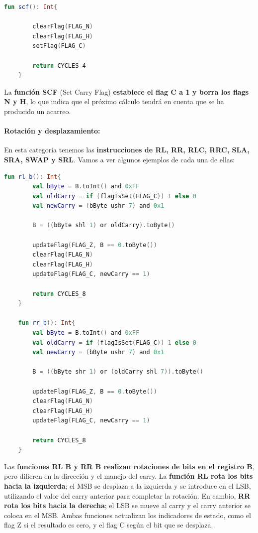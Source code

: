 \begin{lstlisting}[language=Kotlin, caption={Operación SCF}, label={code:kotlinscf}]
    fun scf(): Int{

        clearFlag(FLAG_N)
        clearFlag(FLAG_H)
        setFlag(FLAG_C)

        return CYCLES_4
    }
\end{lstlisting}

La \textbf{función SCF} (Set Carry Flag) \textbf{establece el flag C a 1 y borra los flags N y H}, lo que indica que el próximo cálculo tendrá en cuenta que se ha producido un acarreo.

\paragraph{Rotación y desplazamiento:} En esta categoría tenemos las \textbf{instrucciones de RL, RR, RLC, RRC, SLA, SRA, SWAP y SRL}. Vamos a ver algunos ejemplos de cada una de ellas:

\begin{lstlisting}[language=Kotlin, caption={Operaciones RL y RR}, label={code:kotlinrlrr}]
    fun rl_b(): Int{
        val bByte = B.toInt() and 0xFF
        val oldCarry = if (flagIsSet(FLAG_C)) 1 else 0
        val newCarry = (bByte ushr 7) and 0x1

        B = ((bByte shl 1) or oldCarry).toByte()

        updateFlag(FLAG_Z, B == 0.toByte())
        clearFlag(FLAG_N)
        clearFlag(FLAG_H)
        updateFlag(FLAG_C, newCarry == 1)

        return CYCLES_8
    }
    
    fun rr_b(): Int{
        val bByte = B.toInt() and 0xFF
        val oldCarry = if (flagIsSet(FLAG_C)) 1 else 0
        val newCarry = (bByte ushr 7) and 0x1

        B = ((bByte shr 1) or (oldCarry shl 7)).toByte()

        updateFlag(FLAG_Z, B == 0.toByte())
        clearFlag(FLAG_N)
        clearFlag(FLAG_H)
        updateFlag(FLAG_C, newCarry == 1)

        return CYCLES_8
    }
\end{lstlisting}

Las \textbf{funciones RL B y RR B realizan rotaciones de bits en el registro B}, pero difieren en la dirección y el manejo del carry. La \textbf{función RL rota los bits hacia la izquierda}; el MSB se desplaza a la izquierda y se introduce en el LSB, utilizando el valor del carry anterior para completar la rotación. En cambio, \textbf{RR rota los bits hacia la derecha}; el LSB se mueve al carry y el carry anterior se coloca en el MSB. Ambas funciones actualizan los indicadores de estado, como el flag Z si el resultado es cero, y el flag C según el bit que se desplaza.

